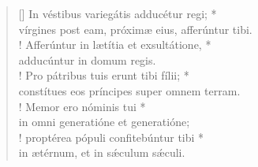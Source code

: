 \begin{verse}[\versewidth]
\vin In véstibus variegátis adducétur regi; *\\
\vin vírgines post eam, próximæ eius, afferúntur tibi.\\!
Afferúntur in lætítia et exsultátione, *\\
adducúntur in domum regis.\\!
\vin Pro pátribus tuis erunt tibi fílii; *\\
\vin constítues eos príncipes super omnem terram.\\!
Memor ero nóminis tui *\\
in omni generatióne et generatióne;\\!
\vin proptérea pópuli confitebúntur tibi *\\
\vin in ætérnum, et in s\'{æ}culum s\'{æ}culi.\\
\end{verse}
\vspace{1cm}


